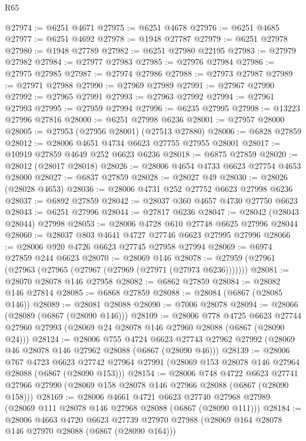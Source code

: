 \begin{lexlean}{R65}
\begin{coremodule}
{@27974 := @6251 @4671
@27975 := @6251 @4678
@27976 := @6251 @4685
@27977 := @6251 @4692
@27978 := @1948 @27787
@27979 := @6251 @27978
@27980 := @1948 @27789
@27982 := @6251 @27980 @22195
@27983 := @27979 @27982
@27984 := @27977 @27983
@27985 := @27976 @27984
@27986 := @27975 @27985
@27987 := @27974 @27986
@27988 := @27973 @27987
@27989 := @27971 @27988
@27990 := @27969 @27989
@27991 := @27967 @27990
@27992 := @27965 @27991
@27993 := @27963 @27992
@27994 := @27961 @27993
@27995 := @27959 @27994
@27996 := @6235 @27995
@27998 := @13223 @27996 @27816
@28000 := @6251 @27998 @6236
@28001 := @27957 @28000
@28005 := @27953 (@27956 @28001) (@27513 @27880)
@28006 := @6828 @27859
@28012 := @28006 @4651 @4734 @6623 @27755 @27955 @28001
@28017 := @10919 @27859 @4649 @252 @6623 @6236
@28018 := @6875 @27859
@28020 := @28012 (@28017 @28018)
@28026 := @28006 @4654 @4733 @6623 @27754 @4653 @28000
@28027 := @6837 @27859
@28028 := @28027 @49
@28030 := @28026 (@28028 @4653)
@28036 := @28006 @4731 @252 @27752 @6623 @27998 @6236
@28037 := @6892 @27859
@28042 := @28037 @360 @4657 @4730 @27750 @6623
@28043 := @6251 @27996
@28044 := @27817 @6236
@28047 := @28042 (@28043 @28044) @27998
@28053 := @28006 @4728 @610 @27748 @6625 @27996 @28044
@28060 := @28037 @803 @4641 @4727 @27746 @6623 @27995 @27996
@28066 := @28006 @920 @4726 @6623 @27745 @27958 @27994
@28069 := @6974 @27859 @244 @6623
@28070 := @28069 @146
@28078 := @27959 (@27961 (@27963 (@27965 (@27967 (@27969 (@27971 (@27973 @6236)))))))
@28081 := @28070 @28078 @146 @27958
@28082 := @6862 @27859
@28084 := @28082 @146 @27814
@28085 := @6868 @27859
@28088 := @28084 (@6867 (@28085 @146))
@28089 := @28081 @28088
@28090 := @7006 @28078
@28094 := @28066 (@28089 (@6867 (@28090 @146)))
@28109 := @28006
    @778
    @4725
    @6623
    @27744
    @27960
    @27993
    (@28069 @24 @28078 @146 @27960 @28088 (@6867 (@28090 @24)))
@28124 := @28006
    @755
    @4724
    @6623
    @27743
    @27962
    @27992
    (@28069 @46 @28078 @146 @27962 @28088 (@6867 (@28090 @46)))
@28139 := @28006
    @767
    @4723
    @6623
    @27742
    @27964
    @27991
    (@28069 @153 @28078 @146 @27964 @28088 (@6867 (@28090 @153)))
@28154 := @28006
    @748
    @4722
    @6623
    @27741
    @27966
    @27990
    (@28069 @158 @28078 @146 @27966 @28088 (@6867 (@28090 @158)))
@28169 := @28006
    @4661
    @4721
    @6623
    @27740
    @27968
    @27989
    (@28069 @111 @28078 @146 @27968 @28088 (@6867 (@28090 @111)))
@28184 := @28006
    @4663
    @4720
    @6623
    @27739
    @27970
    @27988
    (@28069 @164 @28078 @146 @27970 @28088 (@6867 (@28090 @164)))
}
\end{coremodule}
\end{lexlean}
